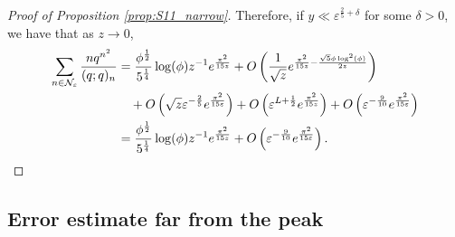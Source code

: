 \documentclass[11pt,reqno]{amsart}
\theoremstyle{remark}
\numberwithin{equation}{section}
\begin{document}
\begin{proof}[Proof of Proposition \ref{prop:S11_narrow}]
Therefore, if $y \ll \varepsilon^{\frac{2}{5}+\delta}$ for some $\delta>0$, we have that as $z \to 0$,
\begin{align*}
	\sum_{n \in \mathcal{N}_{\varepsilon}} \frac{nq^{n^2}}{(q;q)_n} &= \frac{\phi^{\frac12} }{5^{\frac14}}\log(\phi)  z^{-1} e^{\frac{\pi^2}{15 z}}  + O\left(\frac{1}{\sqrt{z}} e^{\frac{\pi^2}{15z}-\frac{\sqrt{5}\phi \log^2(\phi)}{2z}} \right)\\
	&\quad + O\left(\sqrt{z} \varepsilon^{-\frac25} e^{\frac{\pi^2}{15\varepsilon}}\right) + O\left(\varepsilon^{L+\frac12} e^{\frac{\pi^2}{15z}}\right) + O\left(\varepsilon^{-\frac{9}{10}} e^{\frac{\pi^2}{15\varepsilon}}\right)\\
	&= \frac{\phi^{\frac12} }{5^{\frac14}}\log(\phi)  z^{-1} e^{\frac{\pi^2}{15 z}} + O\left(\varepsilon^{-\frac{9}{10}} e^{\frac{\pi^2}{15\varepsilon}}\right). \qedhere
\end{align*}
\end{proof}



\subsection{Error estimate far from the peak}\label{sec:S_far}
\end{document}
